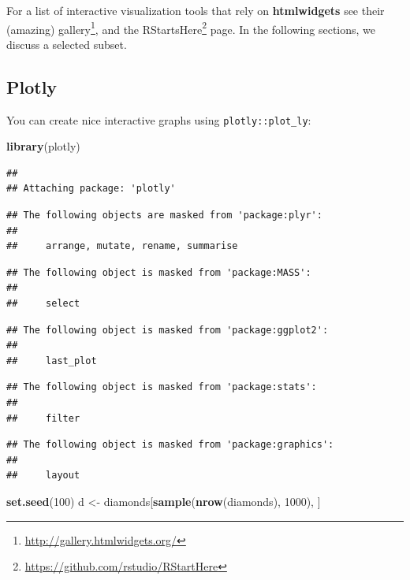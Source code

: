 \documentclass[]{book}
\newenvironment{Shaded}{\begin{snugshade}}{\end{snugshade}}
\newcommand{\DecValTok}[1]{\textcolor[rgb]{0.00,0.00,0.81}{#1}}
\newcommand{\KeywordTok}[1]{\textcolor[rgb]{0.13,0.29,0.53}{\textbf{#1}}}
\newcommand{\NormalTok}[1]{#1}
\newcommand{\StringTok}[1]{\textcolor[rgb]{0.31,0.60,0.02}{#1}}
\renewcommand{\href}[2]{#2\footnote{\url{#1}}}
\theoremstyle{definition}
\theoremstyle{definition}
\theoremstyle{definition}
\theoremstyle{remark}
\begin{document}
For a list of interactive visualization tools that rely on \textbf{htmlwidgets} see \href{http://gallery.htmlwidgets.org/}{their (amazing) gallery}, and the \href{https://github.com/rstudio/RStartHere}{RStartsHere} page.
In the following sections, we discuss a selected subset.

\hypertarget{plotly}{%
\subsection{Plotly}\label{plotly}}

You can create nice interactive graphs using \texttt{plotly::plot\_ly}:

\begin{Shaded}
\begin{Highlighting}[]
\KeywordTok{library}\NormalTok{(plotly)}
\end{Highlighting}
\end{Shaded}

\begin{verbatim}
## 
## Attaching package: 'plotly'
\end{verbatim}

\begin{verbatim}
## The following objects are masked from 'package:plyr':
## 
##     arrange, mutate, rename, summarise
\end{verbatim}

\begin{verbatim}
## The following object is masked from 'package:MASS':
## 
##     select
\end{verbatim}

\begin{verbatim}
## The following object is masked from 'package:ggplot2':
## 
##     last_plot
\end{verbatim}

\begin{verbatim}
## The following object is masked from 'package:stats':
## 
##     filter
\end{verbatim}

\begin{verbatim}
## The following object is masked from 'package:graphics':
## 
##     layout
\end{verbatim}

\begin{Shaded}
\begin{Highlighting}[]
\KeywordTok{set.seed}\NormalTok{(}\DecValTok{100}\NormalTok{)}
\NormalTok{d <-}\StringTok{ }\NormalTok{diamonds[}\KeywordTok{sample}\NormalTok{(}\KeywordTok{nrow}\NormalTok{(diamonds), }\DecValTok{1000}\NormalTok{), ]}
\end{Highlighting}
\end{Shaded}
\end{document}
